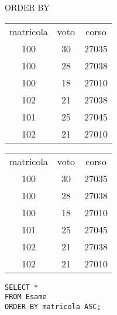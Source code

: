 \begin{frame}{ORDER BY}
\begin{table}[h]
\centering
\begin{minipage}{.45\textwidth}
\centering
\begin{tabular}{|c|c|c|}
\hline
\rowcolor{cyan!30} \multicolumn{3}{|c|}{Esame} \\
\hline
\rowcolor{cyan!30} matricola  & voto & corso \\
\hline
100  & 30 & 27035 \\
100  & 28 & 27038 \\
100  & 18 & 27010 \\
102  & 21 & 27038 \\
101  & 25 & 27045 \\
102 & 21 & 27010 \\
\hline
\end{tabular}
\end{minipage}%
\begin{minipage}{.45\textwidth}
\centering
\begin{tabular}{|c|c|c|}
\hline
\rowcolor{cyan!30} \multicolumn{3}{|c|}{Esame} \\
\hline
\rowcolor{cyan!30} matricola  & voto & corso \\
\hline
100 & 30 & 27035 \\
100 & 28 & 27038 \\
100 & 18 & 27010 \\
101 & 25 & 27045 \\
102 & 21 & 27038 \\
102 & 21 & 27010 \\
\hline
\end{tabular}
\end{minipage}
\end{table}
\vspace{2em}
\texttt{SELECT *\\FROM Esame\\ORDER BY matricola ASC;}
\end{frame}
